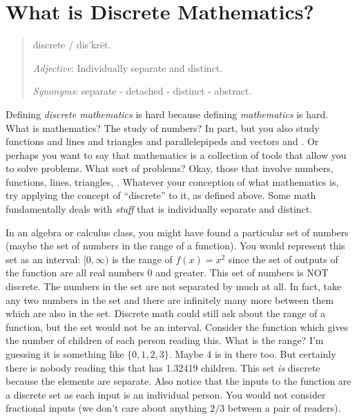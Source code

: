 \documentclass[10pt,]{book}
\theoremstyle{plain}
\theoremstyle{definition}
\theoremstyle{definition}
\numberwithin{equation}{chapter}
\begin{document}
\section[{What is Discrete Mathematics?}]{What is Discrete Mathematics?}\label{sec_intro-intro}
\begin{quote}\hypertarget{blockquote-1}{}
\hypertarget{p-20}{}%
dis\textperiodcentered{}crete / dis'krët.%
\par
\hypertarget{p-21}{}%
\emph{Adjective}: Individually separate and distinct.%
\par
\hypertarget{p-22}{}%
\emph{Synonyms}: separate - detached - distinct - abstract.%
\end{quote}
\hypertarget{p-23}{}%
Defining \emph{discrete mathematics} is hard because defining \emph{mathematics} is hard. What is mathematics? The study of numbers? In part, but you also study functions and lines and triangles and parallelepipeds and vectors and \textellipsis{}. Or perhaps you want to say that mathematics is a collection of tools that allow you to solve problems. What sort of problems? Okay, those that involve numbers, functions, lines, triangles, \textellipsis{}. Whatever your conception of what mathematics is, try applying the concept of ``discrete'' to it, as defined above. Some math fundamentally deals with \emph{stuff} that is individually separate and distinct.%
\par
\hypertarget{p-24}{}%
In an algebra or calculus class, you might have found a particular set of numbers (maybe the set of numbers in the range of a function). You would represent this set as an interval: \([0,\infty)\) is the range of \(f(x) = x^2\) since the set of outputs of the function are all real numbers 0 and greater. This set of numbers is NOT discrete. The numbers in the set are not separated by much at all. In fact, take any two numbers in the set and there are infinitely many more between them which are also in the set. Discrete math could still ask about the range of a function, but the set would not be an interval. Consider the function which gives the number of children of each person reading this. What is the range? I'm guessing it is something like \(\{0, 1, 2, 3\}\). Maybe 4 is in there too. But certainly there is nobody reading this that has 1.32419 children. This set \emph{is} discrete because the elements are separate. Also notice that the inputs to the function are a discrete set as each input is an individual person. You would not consider fractional inputs (we don't care about anything \(2/3\) between a pair of readers).%
\par
\end{document}
